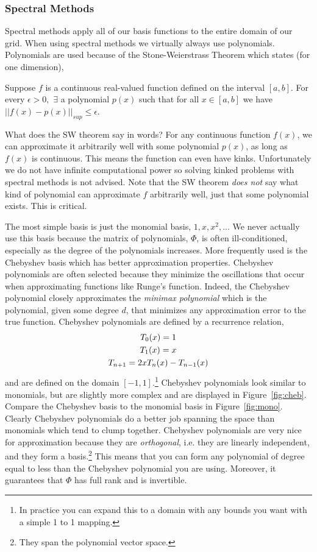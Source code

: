 \documentclass[11pt]{article}%
\begin{document}
\subsubsection{Spectral Methods}
Spectral methods apply all of our basis functions to the entire domain of our grid. When using spectral methods we virtually always use polynomials. Polynomials are used because of the Stone-Weierstrass Theorem which states (for one dimension),
\begin{theorem}
Suppose $f$ is a continuous real-valued function defined on the interval $[a,b]$. For every $\epsilon > 0, \,\, \exists$ a polynomial $p(x)$ such that for all $x \in [a,b]$ we have $||f(x) - p(x)||_{sup} \leq \epsilon$.
\end{theorem}

What does the SW theorem say in words? For any continuous function $f(x)$, we can approximate it arbitrarily well with some polynomial $p(x)$, as long as $f(x)$ is continuous. This means the function can even have kinks. Unfortunately we do not have infinite computational power so solving kinked problems with spectral methods is not advised. Note that the SW theorem \emph{does not} say what kind of polynomial can approximate $f$ arbitrarily well, just that some polynomial exists. This is critical.

The most simple basis is just the monomial basis, $1, x, x^2, ..$. We never actually use this basis because the matrix of polynomials, $\Phi$, is often ill-conditioned, especially as the degree of the polynomials increases. More frequently used is the Chebyshev basis which has better approximation properties. Chebyshev polynomials are often selected because they minimize the oscillations that occur when approximating functions like Runge's function. Indeed, the Chebyshev polynomial closely approximates the \emph{minimax polynomial} which is the polynomial, given some degree $d$, that minimizes any approximation error to the true function. Chebyshev polynomials are defined by a recurrence relation,
\begin{gather}
	T_0(x) = 1 \notag\\
	T_1(x) = x \notag\\
	T_{n+1} = 2xT_n(x) - T_{n-1}(x) \notag
\end{gather}
and are defined on the domain $[-1,1]$.\footnote{In practice you can expand this to a domain with any bounds you want with a simple 1 to 1 mapping.} Chebyshev polynomials look similar to monomials, but are slightly more complex and are displayed in Figure~\ref{fig:cheb}. Compare the Chebyshev basis to the monomial basis in Figure~\ref{fig:mono}. Clearly Chebyshev polynomials do a better job spanning the space than monomials which tend to clump together. Chebyshev polynomials are very nice for approximation because they are \emph{orthogonal}, i.e. they are linearly independent, and they form a basis.\footnote{They span the polynomial vector space.} This means that you can form any polynomial of degree equal to less than the Chebyshev polynomial you are using. Moreover, it guarantees that $\Phi$ has full rank and is invertible.
\end{document}
